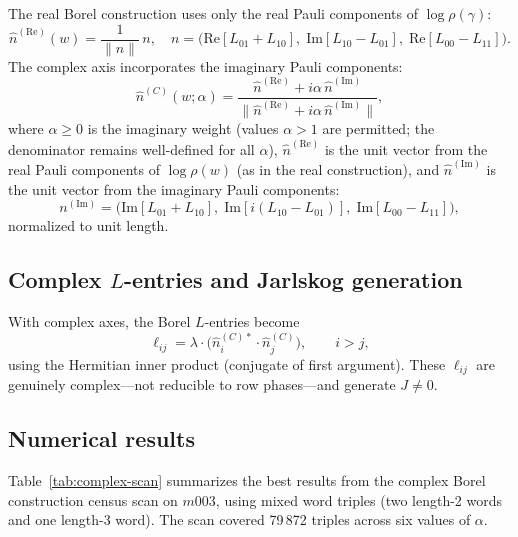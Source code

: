 \documentclass[11pt,a4paper]{article}
\begin{document}
The real Borel construction uses only the real Pauli components of
$\log\rho(\gamma)$:
\begin{equation}
  \hat{n}^{(\mathrm{Re})}(w) = \frac{1}{\|n\|}\,n,
  \quad
  n = \bigl(\mathrm{Re}[L_{01}+L_{10}],\;
             \mathrm{Im}[L_{10}-L_{01}],\;
             \mathrm{Re}[L_{00}-L_{11}]\bigr).
  \label{eq:realaxis}
\end{equation}
The complex axis incorporates the imaginary Pauli components:
\begin{equation}
  \hat{n}^{(C)}(w;\alpha)
  = \frac{\hat{n}^{(\mathrm{Re})} + i\alpha\,\hat{n}^{(\mathrm{Im})}}
         {\|\hat{n}^{(\mathrm{Re})} + i\alpha\,\hat{n}^{(\mathrm{Im})}\|},
  \label{eq:complexaxis}
\end{equation}
where $\alpha \geq 0$ is the imaginary weight (values $\alpha > 1$
are permitted; the denominator remains well-defined for all $\alpha$),
$\hat{n}^{(\mathrm{Re})}$ is the unit vector from the real Pauli
components of $\log\rho(w)$ (as in the real construction), and
$\hat{n}^{(\mathrm{Im})}$ is the unit vector from the imaginary Pauli
components:
\begin{equation*}
  n^{(\mathrm{Im})} = \bigl(\mathrm{Im}[L_{01}+L_{10}],\;
                             \mathrm{Im}[i(L_{10}-L_{01})],\;
                             \mathrm{Im}[L_{00}-L_{11}]\bigr),
\end{equation*}
normalized to unit length.

\subsection{Complex $L$-entries and Jarlskog generation}
\label{subsec:jgen}

With complex axes, the Borel $L$-entries become
\begin{equation}
  \ell_{ij} = \lambda \cdot \bigl(\hat{n}^{(C)*}_i \cdot \hat{n}^{(C)}_j\bigr),
  \qquad i > j,
  \label{eq:complexL}
\end{equation}
using the Hermitian inner product (conjugate of first argument).
These $\ell_{ij}$ are genuinely complex---not reducible to row
phases---and generate $J \neq 0$.

\subsection{Numerical results}
\label{subsec:numresults}

Table~\ref{tab:complex-scan} summarizes the best results from the
complex Borel construction census scan on $m003$, using mixed word
triples (two length-2 words and one length-3 word).  The scan covered
79\,872 triples across six values of $\alpha$.
\end{document}
